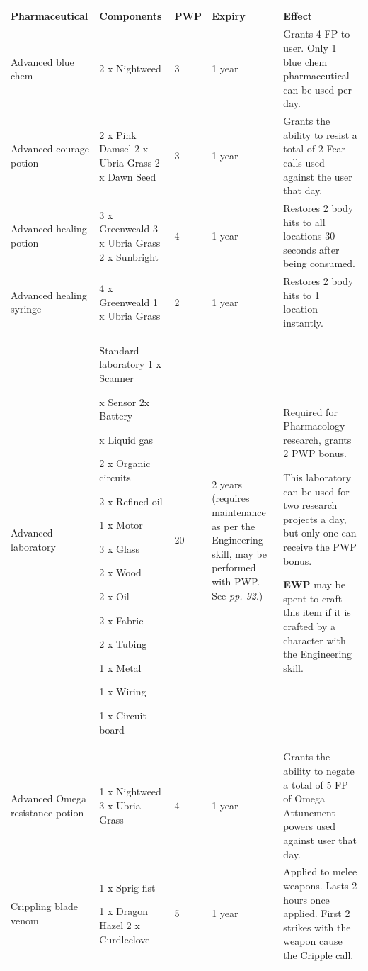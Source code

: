 \begin{table}
\begin{tabular}{|l|l|l|l|l|} \hline 
Pharmaceutical & Components & PWP & Expiry & Effect \\
 \hline Advanced blue chem & 2 x Nightweed & 3 & 1 year & Grants 4 FP to user. Only 1 blue chem pharmaceutical can be used per day. \\
 \hline Advanced courage potion & 2 x Pink Damsel 2 x Ubria Grass 2 x Dawn Seed & 3 & 1 year & Grants the ability to resist a total of 2 Fear calls used against the user that day. \\
 \hline Advanced healing potion & 3 x Greenweald 3 x Ubria Grass 2 x Sunbright & 4 & 1 year & Restores 2 body hits to all locations 30 seconds after being consumed. \\
 \hline Advanced healing syringe & 4 x Greenweald 1 x Ubria Grass & 2 & 1 year & Restores 2 body hits to 1 location instantly. \\
 \hline Advanced laboratory & Standard laboratory 1 x Scanner\par

x Sensor 2x Battery

x Liquid gas

2 x Organic circuits\par 2 x Refined oil\par 1 x Motor\par 3 x Glass\par 2 x Wood\par 2 x Oil\par 2 x Fabric\par 2 x Tubing\par 1 x Metal\par 1 x Wiring\par 1 x Circuit board & 20 & 2 years (requires maintenance as per the Engineering skill, may be performed with PWP. See \textit{pp. 92}.) & Required for Pharmacology research, grants 2 PWP bonus.\par This laboratory can be used for two research projects a day, but only one can receive the PWP bonus.\par \textbf{EWP} may be spent to craft this item if it is crafted by a character with the Engineering skill. \\
 \hline Advanced Omega resistance potion & 1 x Nightweed 3 x Ubria Grass & 4 & 1 year & Grants the ability to negate a total of 5 FP of Omega Attunement powers used against user that day. \\
 \hline Crippling blade venom & 1 x Sprig-fist\par 1 x Dragon Hazel 2 x Curdleclove & 5 & 1 year & Applied to melee weapons. Lasts 2 hours once applied. First 2 strikes with the weapon cause the Cripple call. \\
 \hline \end{tabular}

\end{table}

